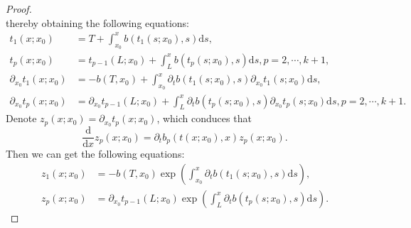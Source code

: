 \documentclass[a4paper,reqno,11pt]{amsart}
\numberwithin{equation}{section} %
\begin{document}
\begin{proof}
\begin{equation}
\end{equation}
thereby obtaining the following equations:
\begin{equation}\label{time line 1}
\begin{aligned}
	t_1 \left( x;x_0 \right) &=T+\int_{x_0}^x b\left( t_1 \left( s;x_0 \right) ,s \right) \text{d}s ,\\
    t_p \left( x;x_0 \right) &=t_{p-1} \left( L;x_0 \right)+\int_{L}^x b\left( t_p \left( s;x_0 \right) ,s \right) \text{d}s , p=2 , \cdots , k+1 ,\\
	\partial _{x_0}t_1\left( x;x_0 \right) &=-b\left( T,x_0 \right) +\int_{x_0}^x{ \partial _t}b\left( t_1 \left( s;x_0 \right) ,s \right) \partial _{x_0}t_1\left( s;x_0 \right) \text{d}s ,\\
	\partial _{x_0}t_p\left( x;x_0 \right) &=\partial _{x_0} t _{p-1} \left( L;x_0 \right) +\int_{L}^x{ \partial _t}b\left( t_p \left( s;x_0 \right) ,s \right) \partial _{x_0}t_p \left( s;x_0 \right) \text{d}s , p=2 , \cdots , k+1 .
\end{aligned}
\end{equation}
Denote $z_p(x;x_0)=\partial _{x_0}t_p \left( x;x_0 \right)$, which conduces that
$$
\frac{\text{d}}{\text{d}x}z_p \left( x;x_0 \right) = \partial _t b_p \left( t\left( x;x_0 \right) ,x \right) z_p \left( x;x_0 \right) .
$$
Then we can get the following equations:
\begin{equation}\label{time line}
	\begin{aligned}
	z_1 \left( x;x_0 \right) &=-b\left( T,x_0 \right) \exp \left(  \int_{x_0}^x{\partial _t}b\left( t_1 \left( s;x_0 \right) ,s \right) \text{d}s \right), \\
	z_p \left( x;x_0 \right) &=\partial _{x_0} t_{p-1} \left( L;x_0 \right) \exp \left(  \int_{L}^x{\partial _t}b\left( t_p \left( s;x_0 \right) ,s \right) \text{d}s \right).
\end{aligned}
\end{equation}


\end{proof}
\end{document}
